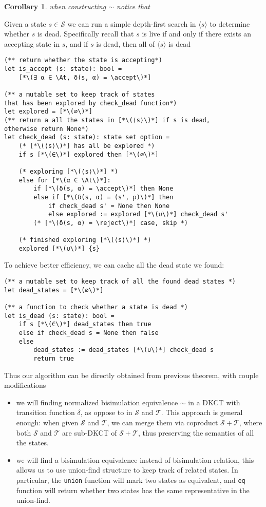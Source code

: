 \documentclass[acmsmall,screen]{acmart}
\newtheorem{corollary}{Corollary}
\newcommand{\At}{\mathbf{At}}
\newcommand{\reject}{\mathinner{\mathtt{Reject}}}
\newcommand{\accept}{\mathinner{\mathtt{Accept}}}
\begin{document}
\begin{corollary}
    when constructing \(∼\) notice that 
\end{corollary}

Given a state \(s ∈ 𝒮\) we can run a simple depth-first search in \(⟨s⟩\) to determine whether \(s\) is dead. Specifically recall that \(s\) is live if and only if there exists an accepting state in \(s\), and if \(s\) is dead, then all of \(⟨s⟩\) is dead
\begin{lstlisting}
(** return whether the state is accepting*)
let is_accept (s: state): bool = 
    [*\(∃ α ∈ \At, δ(s, α) = \accept\)*]

(** a mutable set to keep track of states 
that has been explored by check_dead function*)
let explored = [*\(∅\)*]
(** return a all the states in [*\(⟨s⟩\)*] if s is dead, 
otherwise return None*)
let check_dead (s: state): state set option =
    (* [*\(⟨s⟩\)*] has all be explored *)
    if s [*\(∈\)*] explored then [*\(∅\)*]

    (* exploring [*\(⟨s⟩\)*] *)
    else for [*\(α ∈ \At\)*]:
        if [*\(δ(s, α) = \accept\)*] then None 
        else if [*\(δ(s, α) = (s', p)\)*] then 
            if check_dead s' = None then None 
            else explored := explored [*\(∪\)*] check_dead s'
        (* [*\(δ(s, α) = \reject\)*] case, skip *)

    (* finished exploring [*\(⟨s⟩\)*] *)
    explored [*\(∪\)*] {s}
\end{lstlisting}
To achieve better efficiency, we can cache all the dead state we found:
\begin{lstlisting}
(** a mutable set to keep track of all the found dead states *)
let dead_states = [*\(∅\)*]

(** a function to check whether a state is dead *)
let is_dead (s: state): bool =
    if s [*\(∈\)*] dead_states then true 
    else if check_dead s = None then false 
    else 
        dead_states := dead_states [*\(∪\)*] check_dead s
        return true
\end{lstlisting}

Thus our algorithm can be directly obtained from previous theorem, with couple modifications
\begin{itemize}
    \item  we will finding normalized bisimulation equivalence \(∼\) in a DKCT with transition function \(δ\), as oppose to in \(𝒮\) and \(𝒯\). 
    This approach is general enough: when given \(𝒮\) and \(𝒯\), we can merge them via coproduct \(𝒮 + 𝒯\), where both \(𝒮\) and \(𝒯\) are sub-DKCT of \(𝒮 + 𝒯\), thus preserving the semantics of all the states.
    \item we will find a bisimulation equivalence instead of bisimulation relation, this allows us to use union-find structure to keep track of related states. In particular, the \texttt{union} function will mark two states as equivalent, and \texttt{eq} function will return whether two states has the same representative in the union-find.
\end{itemize}  
\end{document}
